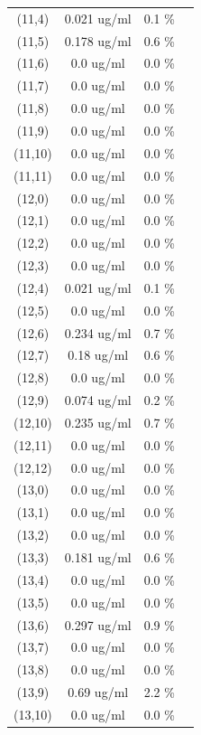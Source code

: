 \documentclass{article}
\begin{document}
\begin{tabular}{c c c c}
(11,4)&        0.021 ug/ml        &0.1 \%\\
(11,5)&        0.178 ug/ml        &0.6 \%\\
(11,6)&        0.0 ug/ml        &0.0 \%\\
(11,7)&        0.0 ug/ml        &0.0 \%\\
(11,8)&        0.0 ug/ml        &0.0 \%\\
(11,9)&        0.0 ug/ml        &0.0 \%\\
(11,10)&        0.0 ug/ml        &0.0 \%\\
(11,11)&        0.0 ug/ml        &0.0 \%\\
(12,0)&        0.0 ug/ml        &0.0 \%\\
(12,1)&        0.0 ug/ml        &0.0 \%\\
(12,2)&        0.0 ug/ml        &0.0 \%\\
(12,3)&        0.0 ug/ml        &0.0 \%\\
(12,4)&        0.021 ug/ml        &0.1 \%\\
(12,5)&        0.0 ug/ml        &0.0 \%\\
(12,6)&        0.234 ug/ml        &0.7 \%\\
(12,7)&        0.18 ug/ml        &0.6 \%\\
(12,8)&        0.0 ug/ml        &0.0 \%\\
(12,9)&        0.074 ug/ml        &0.2 \%\\
(12,10)&        0.235 ug/ml        &0.7 \%\\
(12,11)&        0.0 ug/ml        &0.0 \%\\
(12,12)&        0.0 ug/ml        &0.0 \%\\
(13,0)&        0.0 ug/ml        &0.0 \%\\
(13,1)&        0.0 ug/ml        &0.0 \%\\
(13,2)&        0.0 ug/ml        &0.0 \%\\
(13,3)&        0.181 ug/ml        &0.6 \%\\
(13,4)&        0.0 ug/ml        &0.0 \%\\
(13,5)&        0.0 ug/ml        &0.0 \%\\
(13,6)&        0.297 ug/ml        &0.9 \%\\
(13,7)&        0.0 ug/ml        &0.0 \%\\
(13,8)&        0.0 ug/ml        &0.0 \%\\
(13,9)&        0.69 ug/ml        &2.2 \%\\
(13,10)&        0.0 ug/ml        &0.0 \%\\

\end{tabular}
\end{document}
